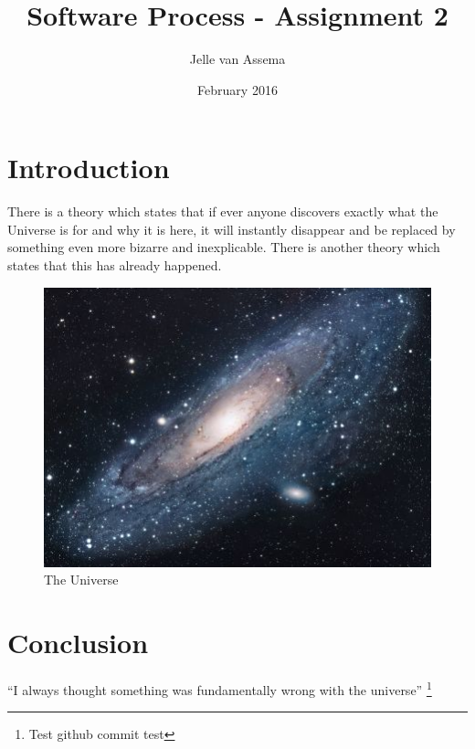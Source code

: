 \documentclass{article}
\title{Software Process - Assignment 2}
\author{Jelle van Assema}
\date{February 2016}
\begin{document}
\maketitle

\section{Introduction}
There is a theory which states that if ever anyone discovers exactly what the Universe is for and why it is here, it will instantly disappear and be replaced by something even more bizarre and inexplicable.
There is another theory which states that this has already happened.

\begin{figure}[h!]
\centering
\includegraphics[scale=1.7]{universe.jpg}
\caption{The Universe}
\label{fig:univerise}
\end{figure}

\section{Conclusion}
``I always thought something was fundamentally wrong with the universe'' \citep[All pages]{adams1995hitchhiker}\footnote{Test github commit test}



\end{document}
